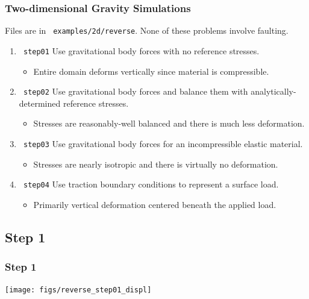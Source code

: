 \documentclass[aspectratio=169]{beamer}
\begin{document}
\begin{frame}
  \frametitle{Two-dimensional Gravity Simulations}
  \summary{}

  \vfill
  Files are in {\tt\color{red} examples/2d/reverse}.
  None of these problems involve faulting.
  \vfill

\begin{enumerate}
\item {\tt\color{red} step01} Use gravitational body forces with no
  reference stresses.
  \begin{itemize}
  \item Entire domain deforms vertically since material is
    compressible.
  \end{itemize}
\item {\tt\color{red} step02} Use gravitational body forces
  and balance them with analytically-determined reference stresses.
  \begin{itemize}
  \item Stresses are reasonably-well balanced and there is much less
    deformation.
  \end{itemize}
\item {\tt\color{red} step03} Use gravitational body forces for an
  incompressible elastic material.
  \begin{itemize}
  \item Stresses are nearly isotropic and there is virtually no
    deformation.
  \end{itemize}
\item {\tt\color{red} step04} Use traction boundary conditions
  to represent a surface load.
  \begin{itemize}
  \item Primarily vertical deformation centered beneath the applied
    load.
  \end{itemize}
\end{enumerate}

\end{frame}


\subsection{Step 1}

\begin{frame}
  \frametitle{Step 1}

  \vfill
  \begin{center}
      \texttt{[image: figs/reverse\_step01\_displ]}
  \end{center}
\vfill
      
\end{frame}
\end{document}
